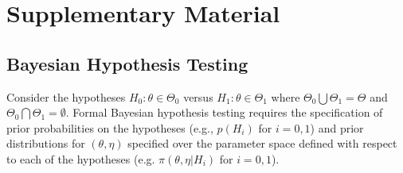 \documentclass[useAMS,usenatbib,referee]{biom}
\begin{document}

\vspace*{-8pt}

\appendix



\section{Supplementary Material}

\subsection{Bayesian Hypothesis Testing}\label{sec:hypothesis}
Consider the hypotheses $H_0:\theta\in\Theta_{0}$ versus $H_1:\theta\in\Theta_{1}$ where $\Theta_{0}\bigcup \Theta_{1} = \Theta$ and $\Theta_{0} \bigcap \Theta_{1} = \emptyset$.
%
Formal Bayesian hypothesis testing requires the specification of prior probabilities on the hypotheses (e.g., $p(H_i)$ for $i=0,1$)
and prior distributions for $\left(\theta,\eta\right)$ specified over the parameter space defined with respect to each of the 
hypotheses (e.g. $\pi\left(\theta,\eta \big| H_i\right)$ for $i=0,1$). 
%
\end{document}
